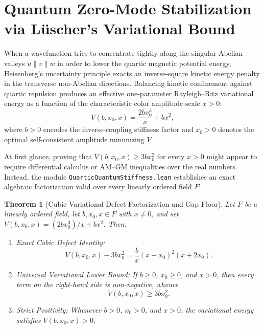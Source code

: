 \documentclass[11pt,a4paper]{article}
\newtheorem{theorem}{Theorem}[section]
\begin{document}
\section{Quantum Zero-Mode Stabilization via L\"uscher's Variational Bound}
When a wavefunction tries to concentrate tightly along the singular Abelian valleys $u \parallel v \parallel w$ in order to lower the quartic magnetic potential energy, Heisenberg's uncertainty principle exacts an inverse-square kinetic energy penalty in the transverse non-Abelian directions. Balancing kinetic confinement against quartic repulsion produces an effective one-parameter Rayleigh--Ritz variational energy as a function of the characteristic color amplitude scale $x > 0$:
\begin{equation}
V(b, x_0, x) = \frac{2 b x_0^3}{x} + b x^2,
\end{equation}
where $b > 0$ encodes the inverse-coupling stiffness factor and $x_0 > 0$ denotes the optimal self-consistent amplitude minimizing $V$.

At first glance, proving that $V(b, x_0, x) \ge 3 b x_0^2$ for every $x > 0$ might appear to require differential calculus or AM--GM inequalities over the real numbers. Instead, the module \texttt{Quartic\-Quantum\-Stiffness.lean} establishes an exact algebraic factorization valid over every linearly ordered field $F$:

\begin{theorem}[Cubic Variational Defect Factorization and Gap Floor]
Let $F$ be a linearly ordered field, let $b, x_0, x \in F$ with $x \neq 0$, and set $V(b, x_0, x) = (2 b x_0^3)/x + b x^2$. Then:
\begin{enumerate}
\item \emph{Exact Cubic Defect Identity:}
\begin{equation}
V(b, x_0, x) - 3 b x_0^2 = \frac{b}{x} (x - x_0)^2 (x + 2 x_0).
\end{equation}
\item \emph{Universal Variational Lower Bound:} If $b \ge 0$, $x_0 \ge 0$, and $x > 0$, then every term on the right-hand side is non-negative, whence
\begin{equation}
V(b, x_0, x) \ge 3 b x_0^2.
\end{equation}
\item \emph{Strict Positivity:} Whenever $b > 0$, $x_0 > 0$, and $x > 0$, the variational energy satisfies $V(b, x_0, x) > 0$.
\end{enumerate}
\end{theorem}
\end{document}
